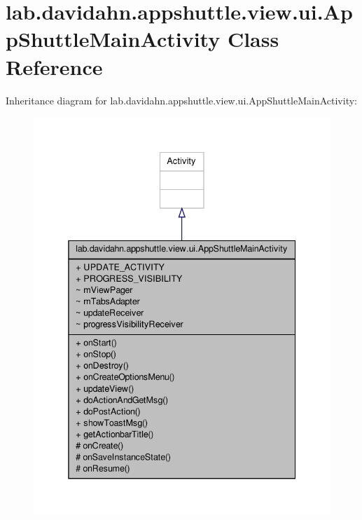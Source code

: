 \hypertarget{classlab_1_1davidahn_1_1appshuttle_1_1view_1_1ui_1_1_app_shuttle_main_activity}{\section{lab.\-davidahn.\-appshuttle.\-view.\-ui.\-App\-Shuttle\-Main\-Activity \-Class \-Reference}
\label{classlab_1_1davidahn_1_1appshuttle_1_1view_1_1ui_1_1_app_shuttle_main_activity}
}


\-Inheritance diagram for lab.\-davidahn.\-appshuttle.\-view.\-ui.\-App\-Shuttle\-Main\-Activity\-:
\nopagebreak
\begin{figure}[H]
\begin{center}
\leavevmode
\includegraphics[width=338pt]{classlab_1_1davidahn_1_1appshuttle_1_1view_1_1ui_1_1_app_shuttle_main_activity__inherit__graph}
\end{center}
\end{figure}



